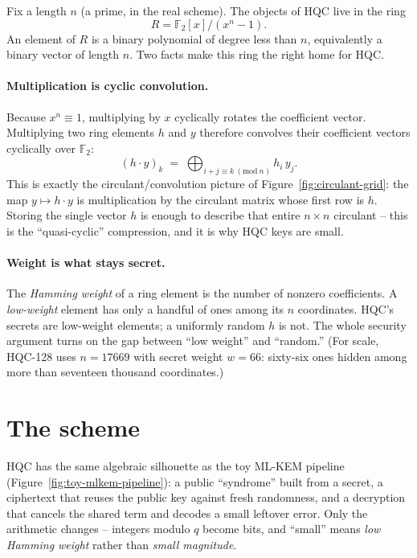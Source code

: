 Fix a length $n$ (a prime, in the real scheme). The objects of HQC live in the ring
\[
R = \mathbb{F}_2[x]\big/(x^n-1).
\]
An element of $R$ is a binary polynomial of degree less than $n$, equivalently a binary vector of length $n$. Two facts make this ring the right home for HQC.

\paragraph{Multiplication is cyclic convolution.} Because $x^n \equiv 1$, multiplying by $x$ cyclically rotates the coefficient vector. Multiplying two ring elements $h$ and $y$ therefore convolves their coefficient vectors cyclically over $\mathbb{F}_2$:
\[
(h\cdot y)_k \;=\; \bigoplus_{i+j\equiv k \ (\mathrm{mod}\ n)} h_i\, y_j .
\]
This is exactly the circulant/convolution picture of Figure~\ref{fig:circulant-grid}: the map $y \mapsto h\cdot y$ is multiplication by the circulant matrix whose first row is $h$. Storing the single vector $h$ is enough to describe that entire $n\times n$ circulant -- this is the ``quasi-cyclic'' compression, and it is why HQC keys are small.

\paragraph{Weight is what stays secret.} The \emph{Hamming weight} of a ring element is the number of nonzero coefficients. A \emph{low-weight} element has only a handful of ones among its $n$ coordinates. HQC's secrets are low-weight elements; a uniformly random $h$ is not. The whole security argument turns on the gap between ``low weight'' and ``random.'' (For scale, HQC-128 uses $n = 17669$ with secret weight $w = 66$: sixty-six ones hidden among more than seventeen thousand coordinates.)

\section{The scheme}

HQC has the same algebraic silhouette as the toy ML-KEM pipeline (Figure~\ref{fig:toy-mlkem-pipeline}): a public ``syndrome'' built from a secret, a ciphertext that reuses the public key against fresh randomness, and a decryption that cancels the shared term and decodes a small leftover error. Only the arithmetic changes -- integers modulo $q$ become bits, and ``small'' means \emph{low Hamming weight} rather than \emph{small magnitude}.

